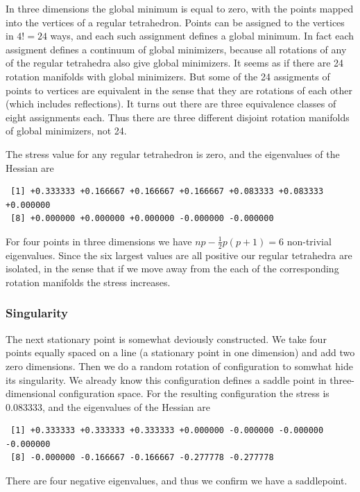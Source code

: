 \documentclass[
  12pt,
  letterpaper,
  DIV=11,
  numbers=noendperiod]{scrreprt}
\theoremstyle{remark}
\begin{document}
In three dimensions the global minimum is equal to zero, with the points
mapped into the vertices of a regular tetrahedron. Points can be
assigned to the vertices in \(4! = 24\) ways, and each such assignment
defines a global minimum. In fact each assigment defines a continuum of
global minimizers, because all rotations of any of the regular
tetrahedra also give global minimizers. It seems as if there are 24
rotation manifolds with global minimizers. But some of the 24 assigments
of points to vertices are equivalent in the sense that they are
rotations of each other (which includes reflections). It turns out there
are three equivalence classes of eight assignments each. Thus there are
three different disjoint rotation manifolds of global minimizers, not
24.

The stress value for any regular tetrahedron is zero, and the
eigenvalues of the Hessian are

\begin{verbatim}
 [1] +0.333333 +0.166667 +0.166667 +0.166667 +0.083333 +0.083333 +0.000000
 [8] +0.000000 +0.000000 +0.000000 -0.000000 -0.000000
\end{verbatim}

For four points in three dimensions we have \(np-\frac12p(p+1)=6\)
non-trivial eigenvalues. Since the six largest values are all positive
our regular tetrahedra are isolated, in the sense that if we move away
from the each of the corresponding rotation manifolds the stress
increases.

\subsubsection{Singularity}\label{singularity}

The next stationary point is somewhat deviously constructed. We take
four points equally spaced on a line (a stationary point in one
dimension) and add two zero dimensions. Then we do a random rotation of
configuration to somwhat hide its singularity. We already know this
configuration defines a saddle point in three-dimensional configuration
space. For the resulting configuration the stress is 0.083333, and the
eigenvalues of the Hessian are

\begin{verbatim}
 [1] +0.333333 +0.333333 +0.333333 +0.000000 -0.000000 -0.000000 -0.000000
 [8] -0.000000 -0.166667 -0.166667 -0.277778 -0.277778
\end{verbatim}

There are four negative eigenvalues, and thus we confirm we have a
saddlepoint.
\end{document}
